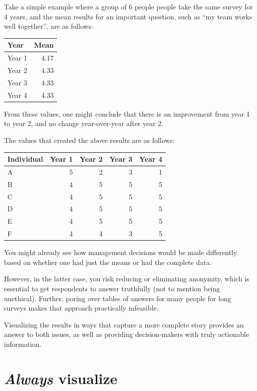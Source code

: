 \documentclass[]{book}
\begin{document}
Take a simple example where a group of 6 people people take the same
survey for 4 years, and the mean results for an important question, such
as ``my team works well together'', are as follows:

\begin{tabular}{l|r}
\hline
Year & Mean\\
\hline
Year 1 & 4.17\\
\hline
Year 2 & 4.33\\
\hline
Year 3 & 4.33\\
\hline
Year 4 & 4.33\\
\hline
\end{tabular}

From these values, one might conclude that there is an improvement from
year 1 to year 2, and no change year-over-year after year 2.

The values that created the above results are as follows:

\begin{tabular}{l|r|r|r|r}
\hline
Individual & Year 1 & Year 2 & Year 3 & Year 4\\
\hline
A & 5 & 2 & 3 & 1\\
\hline
B & 4 & 5 & 5 & 5\\
\hline
C & 4 & 5 & 5 & 5\\
\hline
D & 4 & 5 & 5 & 5\\
\hline
E & 4 & 5 & 5 & 5\\
\hline
F & 4 & 4 & 3 & 5\\
\hline
\end{tabular}

You might already see how management decisions would be made differently
based on whether one had just the means or had the complete data.

However, in the latter case, you risk reducing or eliminating anonymity,
which is essential to get respondents to answer truthfully (not to
mention being unethical). Further, poring over tables of answers for
many people for long surveys makes that approach practically infeasible.

Visualizing the results in ways that capture a more complete story
provides an answer to both issues, as well as providing decision-makers
with truly actionable information.

\chapter{\texorpdfstring{\emph{Always}
visualize}{Always visualize}}\label{always-visualize}
\end{document}

